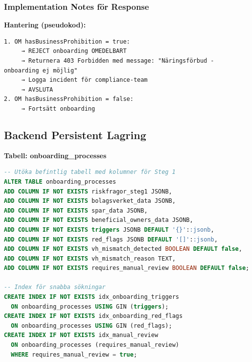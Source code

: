 \documentclass[12pt,a4paper]{article}
\begin{document}
\subsubsection{Implementation Notes för Response}

\textbf{Hantering (pseudokod):}
\begin{lstlisting}
1. OM hasBusinessProhibition = true:
     → REJECT onboarding OMEDELBART
     → Returnera 403 Forbidden med message: "Näringsförbud - onboarding ej möjlig"
     → Logga incident för compliance-team
     → AVSLUTA
2. OM hasBusinessProhibition = false:
     → Fortsätt onboarding
\end{lstlisting}

\subsection{Backend Persistent Lagring}

\textbf{Tabell: onboarding\_processes}
\begin{lstlisting}[language=sql]
-- Utöka befintlig tabell med kolumner för Steg 1
ALTER TABLE onboarding_processes
ADD COLUMN IF NOT EXISTS riskfragor_steg1 JSONB,
ADD COLUMN IF NOT EXISTS bolagsverket_data JSONB,
ADD COLUMN IF NOT EXISTS spar_data JSONB,
ADD COLUMN IF NOT EXISTS beneficial_owners_data JSONB,
ADD COLUMN IF NOT EXISTS triggers JSONB DEFAULT '{}'::jsonb,
ADD COLUMN IF NOT EXISTS red_flags JSONB DEFAULT '[]'::jsonb,
ADD COLUMN IF NOT EXISTS vh_mismatch_detected BOOLEAN DEFAULT false,
ADD COLUMN IF NOT EXISTS vh_mismatch_reason TEXT,
ADD COLUMN IF NOT EXISTS requires_manual_review BOOLEAN DEFAULT false;

-- Index för snabba sökningar
CREATE INDEX IF NOT EXISTS idx_onboarding_triggers 
  ON onboarding_processes USING GIN (triggers);
CREATE INDEX IF NOT EXISTS idx_onboarding_red_flags 
  ON onboarding_processes USING GIN (red_flags);
CREATE INDEX IF NOT EXISTS idx_manual_review
  ON onboarding_processes (requires_manual_review)
  WHERE requires_manual_review = true;
\end{lstlisting}
\end{document}
